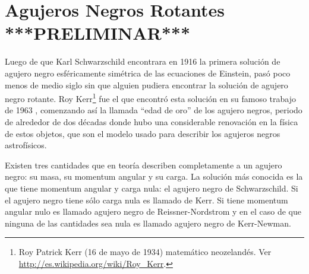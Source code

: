 \chapter{Agujeros Negros Rotantes ***PRELIMINAR***}\label{cap:Kerr}

Luego de que Karl Schwarzschild encontrara en 1916 la primera solución de agujero negro esféricamente simétrica de las ecuaciones de Einstein, pasó poco menos de medio siglo sin que alguien pudiera encontrar la solución de agujero negro rotante.  Roy Kerr\footnote{Roy Patrick Kerr (16 de mayo de 1934) matemático neozelandés. Ver \url{http://es.wikipedia.org/wiki/Roy_Kerr}.} fue el que encontró esta solución en su famoso trabajo de 1963 \cite{Kerr63}, comenzando así la llamada ``edad de oro'' de los agujero negros, periodo de alrededor de dos décadas donde hubo una considerable renovación en la física de estos objetos, que son el modelo usado para describir los agujeros negros astrofísicos.

Existen tres cantidades que en teoría describen completamente a un agujero negro: su masa, su momentum angular y su carga. La solución más conocida es la que tiene momentum angular y carga nula: el agujero negro de Schwarzschild. Si el agujero negro tiene sólo carga nula es llamado de Kerr. Si tiene momentum angular nulo es llamado agujero negro de Reissner-Nordstrom y en el caso de que ninguna de las cantidades sea nula es llamado agujero negro de Kerr-Newman. 



